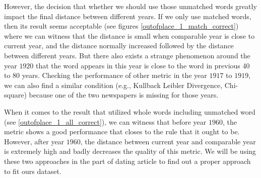However, the decision that whether we should use those unmatched words greatly impact the final distance between different years. If we only use matched words, then its result seems acceptable (see figures \ref{outofplace_1_match_correct}) where we can witness that the distance is small when comparable year is close to current year, and the distance normally increased followed by the distance between different years. But there also exists a strange phenomenon around the year $1920$ that the word appears in this year is close to the word in previous 40 to 80 years. Checking the performance of other metric in the year $1917$ to $1919$, we can also find a similar condition (e.g., Kullback Leibler Divergence, Chi-square) because one of the two newspapers is missing for those years.

When it comes to the result that utilized whole words including unmatched word (see \ref{outofplace_1_all_correct}), we can witness that before year $1960$, the metric shows a good performance that closes to the rule that it ought to be. However, after year $1960$, the distance between current year and comparable year is extremely high and badly decreases the quality of this metric. We will be using these two approaches in the part of dating article to find out a proper approach to fit ours dataset.
